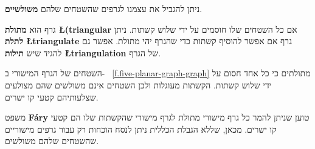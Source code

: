 %
%
%
%
%
%
ניתן להגביל את עצמנו לגרפים שהשטחים שלהם
\textbf{משולשיים}.

\begin{definition}
גרף הוא
\textbf{מתולת
\L{(triangular}}
אם כל השטחים שלו חוסמים על ידי שלוש קשתות. ניתן 
\textbf{לתלת
\L{triangulate}}
גרף אם אפשר להוסיף קשתות כדי שהגרף יהי מתולת. אפשר גם להגיד שיש
\textbf{תילות
\L{triangulation}}
של הגרף.
\end{definition}

\begin{example}
השטחים של הגרף המישורי ב-%
~\ref{f.five-planar-graph-graph}
מתולתים כי כל אחד חסום על ידי שלוש קשתות. הקשתות מעוגלות ולכן השטחים אינם משולשים שהם מצולעים שצלעותיהם קטעי קו ישרים.
\end{example}

\begin{advanced}
משפט
\textbf{F\'{a}ry}
טוען שניתן להמר כל גרף מישורי מתולת לגרף מישורי שהקשתות שלו הם קטעי קו ישרים. מכאן, שללא הגבלת הכללית ניתן לנסח הוכחות רק עבור גרפים מישוריים שהשטחים שלהם משולשים.
\end{advanced}

